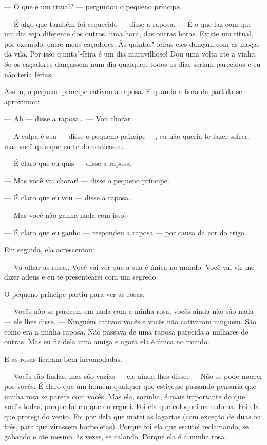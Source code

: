 \begin{Parallel}[p]{}{}
{--- O que é um ritual? --- perguntou o pequeno príncipe.

--- É algo que também foi esquecido --- disse a raposa. --- É o que faz com
que um dia seja diferente dos outros, uma hora, das outras horas. Existe
um ritual, por exemplo, entre meus caçadores. Às quintas"-feiras eles
dançam com as moças da vila. Por isso quinta"-feira é um dia maravilhoso!
Dou uma volta até a vinha. Se os caçadores dançassem num dia qualquer,
todos os dias seriam parecidos e eu não teria férias.

Assim, o pequeno príncipe cativou a raposa. E quando a hora da partida
se aproximou:

--- Ah --- disse a raposa\ldots{} --- Vou chorar.

--- A culpa é sua --- disse o pequeno príncipe ---, eu não queria te fazer
sofrer, mas você quis que eu te domesticasse\ldots{}

--- É claro que eu quis --- disse a raposa.

--- Mas você vai chorar! --- disse o pequeno príncipe.

--- É claro que eu vou --- disse a raposa.

--- Mas você não ganha nada com isso!

--- É claro que eu ganho --- respondeu a raposa --- por causa da cor do
trigo.

Em seguida, ela acrescentou:

--- Vá olhar as rosas. Você vai ver que a sua é única no mundo. Você vai
vir me dizer adeus e eu te presentearei com um segredo.

O pequeno príncipe partiu para ver as rosas:

--- Vocês não se parecem em nada com a minha rosa, vocês ainda não são
nada --- ele lhes disse. --- Ninguém cativou vocês e vocês não cativaram
ninguém. São como era a minha raposa. Não passava de uma raposa parecida
a milhares de outras. Mas eu fiz dela uma amiga e agora ela é única no
mundo.

E as rosas ficaram bem incomodadas.

--- Vocês são lindas, mas são vazias --- ele ainda lhes disse. --- Não se
pode morrer por vocês. É claro que um homem qualquer que estivesse
passando pensaria que minha rosa se parece com vocês. Mas ela, sozinha,
é mais importante do que vocês todas, porque foi ela que eu reguei. Foi
ela que coloquei na redoma. Foi ela que protegi do vento. Foi por dela
que matei as lagartas (com exceção de duas ou três, para que virassem
borboletas). Porque foi ela que escutei reclamando, se gabando e até
mesmo, às vezes, se calando. Porque ela é a minha rosa.

}
\end{Parallel}
